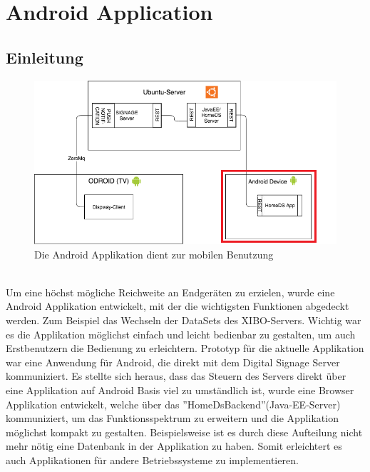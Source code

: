 \chapter{Android Application}
\section{Einleitung}

\begin{figure}[H]
\centering
\includegraphics[width=1.0\textwidth]{images/06_AndroidApp/06_SystemArch}
\caption{Die Android Applikation dient zur mobilen Benutzung}

\end{figure}
\\
Um eine höchst mögliche Reichweite an Endgeräten zu erzielen, wurde eine Android Applikation entwickelt, mit der die wichtigsten Funktionen abgedeckt werden. Zum Beispiel das Wechseln der DataSets des XIBO-Servers. Wichtig war es die Applikation möglichst einfach und leicht bedienbar zu gestalten, um auch Erstbenutzern die Bedienung zu erleichtern. 
Prototyp für die aktuelle Applikation war eine Anwendung für Android, die direkt mit dem Digital Signage Server kommuniziert. Es stellte sich heraus, dass das Steuern des Servers direkt über eine Applikation auf Android Basis viel zu umständlich ist, wurde eine Browser Applikation entwickelt, welche über das ''HomeDsBackend''(Java-EE-Server) kommuniziert, um das Funktionsspektrum zu erweitern und die Applikation möglichst kompakt zu gestalten. Beispielsweise ist es durch diese Aufteilung nicht mehr nötig eine Datenbank in der Applikation zu haben. Somit erleichtert es auch Applikationen für andere Betriebssysteme zu implementieren. 
